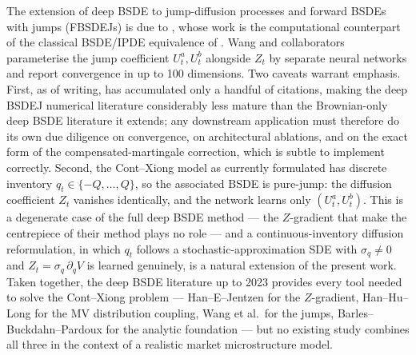 The extension of deep BSDE to jump-diffusion processes and forward
BSDEs with jumps (FBSDEJs) is due to \citet{wang2023}, whose work
is the computational counterpart of the classical BSDE/IPDE
equivalence of \citet{barles1997}.  Wang and collaborators
parameterise the jump coefficient $U_t^a, U_t^b$ alongside $Z_t$ by
separate neural networks and report convergence in up to 100
dimensions.  Two caveats warrant emphasis.  First, as of writing,
\citet{wang2023} has accumulated only a handful of citations,
making the deep BSDEJ numerical literature considerably less
mature than the Brownian-only deep BSDE literature it extends;
any downstream application must therefore do its own due
diligence on convergence, on architectural ablations, and on the
exact form of the compensated-martingale correction, which is
subtle to implement correctly.  Second, the Cont--Xiong model as currently formulated
has discrete inventory $q_t \in \{-Q, \ldots, Q\}$, so the
associated BSDE is pure-jump: the diffusion coefficient $Z_t$
vanishes identically, and the network learns only
$(U_t^a, U_t^b)$.  This is a degenerate case of the full deep BSDE
method — the $Z$-gradient that \citet{han2018} make the centrepiece
of their method plays no role — and a continuous-inventory
diffusion reformulation, in which $q_t$ follows a
stochastic-approximation SDE with $\sigma_q \neq 0$ and
$Z_t = \sigma_q\,\partial_q V$ is learned genuinely, is a natural
extension of the present work.  Taken together, the deep BSDE
literature up to 2023 provides every tool needed to solve the
Cont--Xiong problem — Han--E--Jentzen for the $Z$-gradient,
Han--Hu--Long for the MV distribution coupling, Wang et al.\ for the
jumps, Barles--Buckdahn--Pardoux for the analytic foundation — but
no existing study combines all three in the context of a realistic
market microstructure model.


